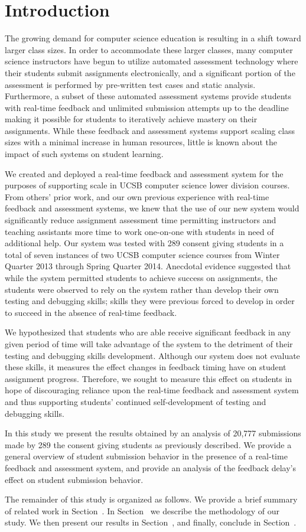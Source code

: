 \section{Introduction}
The growing demand for computer science education is resulting in a shift
toward larger class sizes. In order to accommodate these larger classes, many
computer science instructors have begun to utilize automated assessment
technology where their students submit assignments electronically, and a
significant portion of the assessment is performed by pre-written test cases
and static analysis. Furthermore, a subset of these automated assessment
systems provide students with real-time feedback and unlimited submission
attempts up to the deadline making it possible for students to iteratively
achieve mastery on their assignments. While these feedback and assessment
systems support scaling class sizes with a minimal increase in human resources,
little is known about the impact of such systems on student learning.

We created and deployed a real-time feedback and assessment system for the
purposes of supporting scale in UCSB computer science lower division
courses. From others' prior work, and our own previous experience with
real-time feedback and assessment systems, we knew that the use of our new
system would significantly reduce assignment assessment time permitting
instructors and teaching assistants more time to work one-on-one with students
in need of additional help. Our system was tested with 289 consent giving
students in a total of seven instances of two UCSB computer science courses
from Winter Quarter 2013 through Spring Quarter 2014. Anecdotal evidence
suggested that while the system permitted students to achieve success on
assignments, the students were observed to rely on the system rather than
develop their own testing and debugging skills; skills they were previous
forced to develop in order to succeed in the absence of real-time feedback.

We hypothesized that students who are able receive significant feedback in any
given period of time will take advantage of the system to the detriment of
their testing and debugging skills development. Although our system does not
evaluate these skills, it measures the effect changes in feedback timing have
on student assignment progress. Therefore, we sought to measure this effect on
students in hope of discouraging reliance upon the real-time feedback and
assessment system and thus supporting students' continued self-development of
testing and debugging skills.

In this study we present the results obtained by an analysis of 20,777
submissions made by 289 the consent giving students as previously described. We
provide a general overview of student submission behavior in the presence of a
real-time feedback and assessment system, and provide an analysis of the
feedback delay's effect on student submission behavior.

The remainder of this study is organized as follows. We provide a brief summary
of related work in Section~. In
Section~ we describe the methodology of our study. We
then present our results in Section~, and finally,
conclude in Section~.
